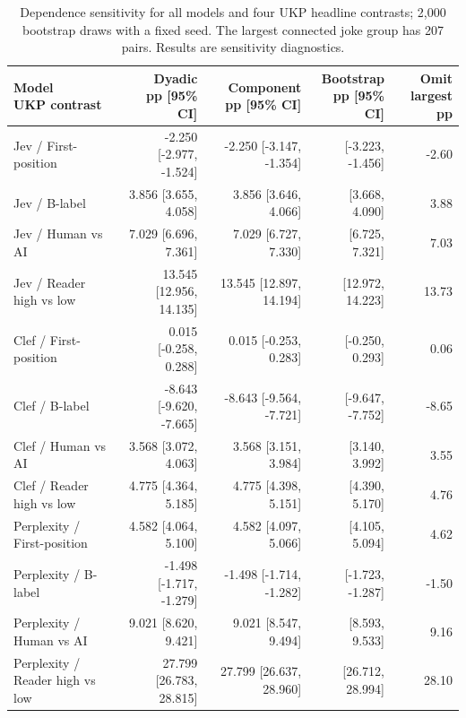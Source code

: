 \begin{table}[t]
\centering\footnotesize
\setlength{\tabcolsep}{3.5pt}
\begin{tabular}{@{}lrrrr@{}}
\toprule
\shortstack[l]{Model\\{}UKP contrast} & \shortstack[l]{Dyadic\\{}pp [95\% CI]} & \shortstack[l]{Component\\{}pp [95\% CI]} & \shortstack[l]{Bootstrap\\{}pp [95\% CI]} & \shortstack[l]{Omit largest\\{}pp} \\
\midrule
Jev / First-position & -2.250 [-2.977, -1.524] & -2.250 [-3.147, -1.354] & [-3.223, -1.456] & -2.60 \\
Jev / B-label & 3.856 [3.655, 4.058] & 3.856 [3.646, 4.066] & [3.668, 4.090] & 3.88 \\
Jev / Human vs AI & 7.029 [6.696, 7.361] & 7.029 [6.727, 7.330] & [6.725, 7.321] & 7.03 \\
Jev / Reader high vs low & 13.545 [12.956, 14.135] & 13.545 [12.897, 14.194] & [12.972, 14.223] & 13.73 \\
Clef / First-position & 0.015 [-0.258, 0.288] & 0.015 [-0.253, 0.283] & [-0.250, 0.293] & 0.06 \\
Clef / B-label & -8.643 [-9.620, -7.665] & -8.643 [-9.564, -7.721] & [-9.647, -7.752] & -8.65 \\
Clef / Human vs AI & 3.568 [3.072, 4.063] & 3.568 [3.151, 3.984] & [3.140, 3.992] & 3.55 \\
Clef / Reader high vs low & 4.775 [4.364, 5.185] & 4.775 [4.398, 5.151] & [4.390, 5.170] & 4.76 \\
Perplexity / First-position & 4.582 [4.064, 5.100] & 4.582 [4.097, 5.066] & [4.105, 5.094] & 4.62 \\
Perplexity / B-label & -1.498 [-1.717, -1.279] & -1.498 [-1.714, -1.282] & [-1.723, -1.287] & -1.50 \\
Perplexity / Human vs AI & 9.021 [8.620, 9.421] & 9.021 [8.547, 9.494] & [8.593, 9.533] & 9.16 \\
Perplexity / Reader high vs low & 27.799 [26.783, 28.815] & 27.799 [26.637, 28.960] & [26.712, 28.994] & 28.10 \\
\bottomrule
\end{tabular}
\caption{Dependence sensitivity for all models and four UKP headline contrasts; 2,000 bootstrap draws with a fixed seed. The largest connected joke group has 207 pairs. Results are sensitivity diagnostics.}
\label{tab:appendix_dependence}
\end{table}
